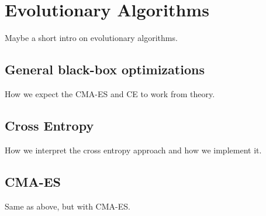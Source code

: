 \section{Evolutionary Algorithms}

Maybe a short intro on evolutionary algorithms.

\subsection{General black-box optimizations}

How we expect the CMA-ES and CE to work from theory.

\subsection{Cross Entropy}

How we interpret the cross entropy approach and how we implement it.

\subsection{CMA-ES}

Same as above, but with CMA-ES.
